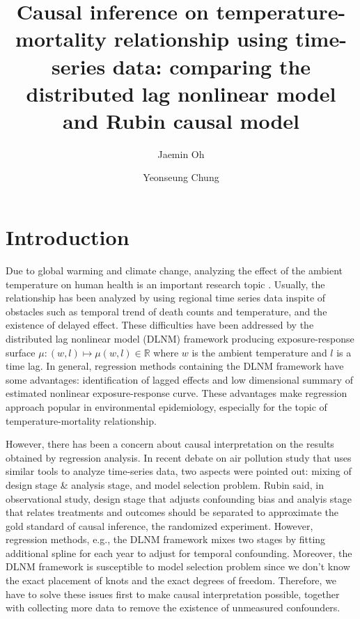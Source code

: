 \documentclass[12pt]{article}
\author[1]{Jaemin Oh}
\author[2]{Yeonseung Chung}
\affil[1,2]{Department of Mathematical Sciences, 
KAIST, Daejeon, South Korea}
\title{
	Causal inference on temperature-mortality relationship using time-series data: 
	comparing the distributed lag nonlinear model and Rubin causal model
	} %
\begin{document}
\maketitle
\tableofcontents


\section{Introduction}

Due to global warming and climate change,
analyzing the effect of the ambient temperature on human health is an important research topic
\cite{gasparrini2017, yoonhee2019}.
Usually, the relationship has been analyzed by using regional time series data
inspite of obstacles such as 
temporal trend of death counts and temperature, and the existence of delayed effect.
These difficulties have been addressed by 
the distributed lag nonlinear model (DLNM) framework\cite{dlnm2010}
producing exposure-response surface
$\mu : (w, l) \mapsto \mu(w,l) \in \mathbb{R}$ where $w$ is the ambient temperature and $l$ is a time lag.
In general, regression methods containing the DLNM framework have some advantages:
identification of lagged effects and
low dimensional summary of estimated nonlinear exposure-response curve.
These advantages make regression approach popular in environmental epidemiology,
especially for the topic of temperature-mortality relationship.

However, there has been a concern about causal interpretation 
on the results obtained by regression analysis.
In recent debate on air pollution study\cite{dominici2019sci} 
that uses similar tools to analyze time-series data,
two aspects were pointed out:
mixing of design stage \& analysis stage, and model selection problem.
Rubin said, in observational study,
design stage that adjusts confounding bias and analyis stage that relates treatments and outcomes
should be separated to approximate the gold standard of causal inference, 
the randomized experiment\cite{rubin2007sim}.
However, regression methods, e.g., the DLNM framework mixes two stages
by fitting additional spline for each year to adjust for temporal confounding.
Moreover, the DLNM framework is susceptible to model selection problem\cite{gasparrini2016}
since we don't know the exact placement of knots and the exact degrees of freedom.
Therefore, we have to solve these issues first to make causal interpretation possible,
together with collecting more data to remove the existence of unmeasured confounders.
\end{document}

